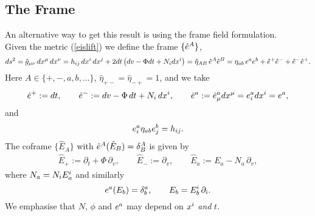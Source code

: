 \documentclass{article}
\begin{document}
\subsection{The Frame}
An alternative way to get this result is using the frame field formulation. \\
Given the metric (\ref{eislift}) we define the frame $\{ {\hat e}\sp{A}\}$,
\begin{equation*}
ds^2=\hat g_{\mu\nu}\,dx\sp{\mu}\,dx\sp{\nu}
=h_{ij}\, dx\sp{i}\, dx\sp{j}+2dt \left( dv-\Phi dt+N_i dx\sp{i}\right)
= {\hat \eta}_{AB}\, {\hat e}\sp{A} {\hat e}\sp{B}
= \eta_{ab}\, e\sp{a} e\sp{b}+  {\hat e}\sp{+} {\hat e}\sp{-} +  {\hat e}\sp{-} {\hat e}\sp{+}.
\end{equation*}
Here $A\in \{+,-,a,b,\ldots\}$, $ {\hat \eta}_{+-}={\hat \eta}_{-+}=1$, and we take
\begin{align*}
{\hat e}\sp{+}:= dt,\qquad
{\hat e}\sp{-} :=dv-\Phi\,dt +N_i\,dx\sp{i},\qquad
{\hat e}\sp{a} := {\hat e}\sp{a}_{\mu} dx\sp{\mu}= { e}\sp{a}_{i} dx\sp{i}= { e}\sp{a},
\end{align*}
and 
$$e\sp{a}_i \eta_{ab} e\sp{b}_j =h_{ij}.$$
The coframe  $\{ {\hat E}_{A}\}$ with ${\hat e}\sp{A}(  {\hat E}_{B})=\delta\sp{A}_B$ is given by
\begin{align*}
{\hat E}_{+}:= \partial_t +\Phi\,\partial_v,\qquad
{\hat E}_{-} :=\partial_v,\qquad
{\hat E}_{a} := {E}_{a}- N_a\,\partial_v,
\end{align*}
where $N_a=N_i E_a\sp{i}$ and similarly
$$ { e}\sp{a}(  { E}_{b})=\delta\sp{a}_b,\qquad { E}_{b}={ E}_{b}\sp{i}\,\partial_i.
$$
We emphasise that $N$, $\phi$ and $e\sp{a}$ may depend on $x\sp{i}$ \emph{and} $t$.
\end{document}
